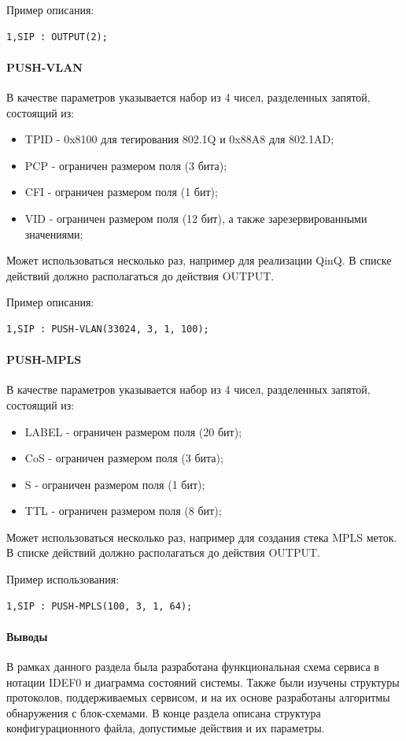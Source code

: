 Пример описания:
\begin{lstlisting}
1,SIP : OUTPUT(2);
\end{lstlisting}

\paragraph{PUSH-VLAN}

В качестве параметров указывается набор из 4 чисел, разделенных запятой, состоящий из:
\begin{itemize}
\item TPID - 0x8100 для тегирования 802.1Q и 0x88A8 для 802.1AD;
\item PCP - ограничен размером поля (3 бита);
\item CFI - ограничен размером поля (1 бит);
\item VID - ограничен размером поля (12 бит), а также зарезервированными значениями;
\end{itemize}

Может использоваться несколько раз, например для реализации QinQ. В списке действий должно располагаться до действия OUTPUT.

Пример описания:
\begin{lstlisting}
1,SIP : PUSH-VLAN(33024, 3, 1, 100);
\end{lstlisting}

\paragraph{PUSH-MPLS}

В качестве параметров указывается набор из 4 чисел, разделенных запятой, состоящий из:
\begin{itemize}
\item LABEL - ограничен размером поля (20 бит);
\item CoS - ограничен размером поля (3 бита);
\item S - ограничен размером поля (1 бит);
\item TTL - ограничен размером поля (8 бит);
\end{itemize}

Может использоваться несколько раз, например для создания стека MPLS меток. В списке действий должно располагаться до действия OUTPUT.

Пример использования:
\begin{lstlisting}
1,SIP : PUSH-MPLS(100, 3, 1, 64);
\end{lstlisting}

\paragraph{Выводы}

В рамках данного раздела была разработана функциональная схема сервиса в нотации IDEF0 и диаграмма состояний системы. Также были изучены структуры протоколов, поддерживаемых сервисом, и на их основе разработаны алгоритмы обнаружения с блок-схемами. В конце раздела описана структура конфигурационного файла, допустимые действия и их параметры.
